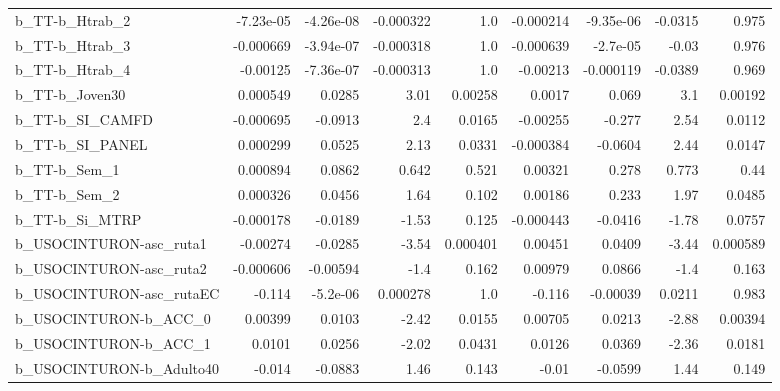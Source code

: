 \begin{tabular}{lrrrrrrrr}
b\_TT-b\_Htrab\_2             &   -7.23e-05 &    -4.26e-08 & -0.000322 &      1.0 &  -0.000214 &   -9.35e-06 &      -0.0315 &         0.975 \\
b\_TT-b\_Htrab\_3             &   -0.000669 &    -3.94e-07 & -0.000318 &      1.0 &  -0.000639 &    -2.7e-05 &        -0.03 &         0.976 \\
b\_TT-b\_Htrab\_4             &    -0.00125 &    -7.36e-07 & -0.000313 &      1.0 &   -0.00213 &   -0.000119 &      -0.0389 &         0.969 \\
b\_TT-b\_Joven30             &    0.000549 &       0.0285 &      3.01 &  0.00258 &     0.0017 &       0.069 &          3.1 &       0.00192 \\
b\_TT-b\_SI\_CAMFD            &   -0.000695 &      -0.0913 &       2.4 &   0.0165 &   -0.00255 &      -0.277 &         2.54 &        0.0112 \\
b\_TT-b\_SI\_PANEL            &    0.000299 &       0.0525 &      2.13 &   0.0331 &  -0.000384 &     -0.0604 &         2.44 &        0.0147 \\
b\_TT-b\_Sem\_1               &    0.000894 &       0.0862 &     0.642 &    0.521 &    0.00321 &       0.278 &        0.773 &          0.44 \\
b\_TT-b\_Sem\_2               &    0.000326 &       0.0456 &      1.64 &    0.102 &    0.00186 &       0.233 &         1.97 &        0.0485 \\
b\_TT-b\_Si\_MTRP             &   -0.000178 &      -0.0189 &     -1.53 &    0.125 &  -0.000443 &     -0.0416 &        -1.78 &        0.0757 \\
b\_USOCINTURON-asc\_ruta1    &    -0.00274 &      -0.0285 &     -3.54 & 0.000401 &    0.00451 &      0.0409 &        -3.44 &      0.000589 \\
b\_USOCINTURON-asc\_ruta2    &   -0.000606 &     -0.00594 &      -1.4 &    0.162 &    0.00979 &      0.0866 &         -1.4 &         0.163 \\
b\_USOCINTURON-asc\_rutaEC   &      -0.114 &     -5.2e-06 &  0.000278 &      1.0 &     -0.116 &    -0.00039 &       0.0211 &         0.983 \\
b\_USOCINTURON-b\_ACC\_0      &     0.00399 &       0.0103 &     -2.42 &   0.0155 &    0.00705 &      0.0213 &        -2.88 &       0.00394 \\
b\_USOCINTURON-b\_ACC\_1      &      0.0101 &       0.0256 &     -2.02 &   0.0431 &     0.0126 &      0.0369 &        -2.36 &        0.0181 \\
b\_USOCINTURON-b\_Adulto40   &      -0.014 &      -0.0883 &      1.46 &    0.143 &      -0.01 &     -0.0599 &         1.44 &         0.149 \\

\end{tabular}
